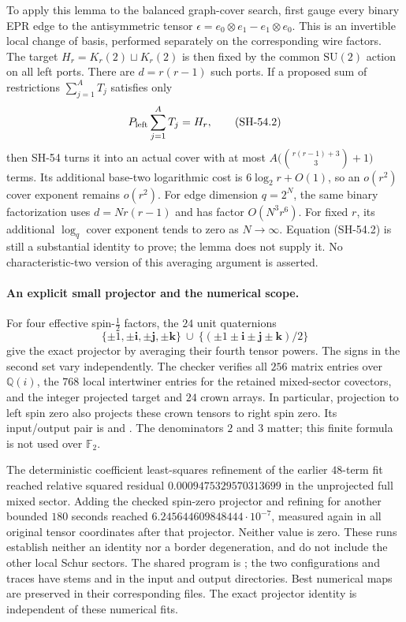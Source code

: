 To apply this lemma to the balanced graph-cover search,
first gauge every binary EPR edge to the antisymmetric
tensor $\epsilon=e_0\otimes e_1-e_1\otimes e_0$.
This is an invertible local change of basis, performed
separately on the corresponding wire factors.  The
target $H_r=K_r(2)\sqcup K_r(2)$ is then fixed by the
common $\mathrm{SU}(2)$ action on all left ports.
There are $d=r(r-1)$ such ports.  If a proposed sum of
restrictions $\sum_{j=1}^A T_j$ satisfies only
\[
 P_{\rm left}\sum_{j=1}^A T_j=H_r,
 \tag{SH-54.2}
\]
then SH-54 turns it into an actual cover with at most
$A\bigl({r(r-1)+3\choose3}+1\bigr)$ terms.  Its
additional base-two logarithmic cost is
$6\log_2r+O(1)$, so an $o(r^2)$ cover exponent remains
$o(r^2)$.  For edge dimension $q=2^N$, the same binary
factorization uses $d=Nr(r-1)$ and has factor
$O(N^3r^6)$.  For fixed $r$, its additional
$\log_q$ cover exponent tends to zero as $N\to\infty$.
Equation (SH-54.2) is still a substantial identity to
prove; the lemma does not supply it.  No
characteristic-two version of this averaging argument
is asserted.

\paragraph{An explicit small projector and the numerical scope.}
For four effective spin-$\tfrac12$ factors, the
$24$ unit quaternions
\[
 \{\pm1,\pm\mathbf i,\pm\mathbf j,\pm\mathbf k\}
 \ \cup\
 \{(\pm1\pm\mathbf i\pm\mathbf j\pm\mathbf k)/2\}
\]
give the exact projector by averaging their fourth
tensor powers.  The signs in the second set vary
independently.  The checker
verifies all $256$ matrix entries over $\mathbb Q(i)$,
the $768$ local intertwiner entries for the retained
mixed-sector covectors, and the integer projected
target and $24$ crown arrays.  In particular, projection
to left spin zero also projects these crown tensors
to right spin zero.  Its input/output pair is
 and
.
The denominators $2$ and $3$ matter; this finite
formula is not used over $\mathbb F_2$.

The deterministic coefficient least-squares refinement
of the earlier $48$-term fit reached relative squared
residual $0.0009475329570313699$ in the unprojected
full mixed sector.  Adding the checked spin-zero
projector and refining for another bounded
$180$ seconds reached
$6.245644609848444\cdot10^{-7}$, measured again in
all original tensor coordinates after that projector.
Neither value is zero.  These runs establish neither
an identity nor a border degeneration, and do not
include the other local Schur sectors.  The shared
program is
;
the two configurations and traces have stems
 and
 in the input and
output directories.  Best numerical maps are
preserved in their corresponding 
files.  The exact projector identity is independent
of these numerical fits.


